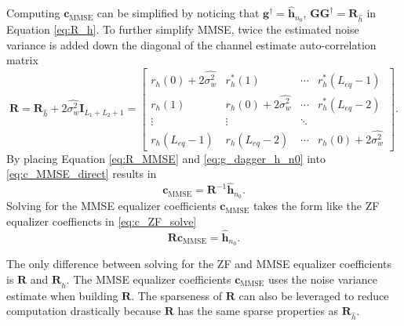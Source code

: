 Computing $\mathbf{c}_\text{MMSE}$ can be simplified by noticing that $\mathbf{g}^\dagger = \hat{\mathbf{h}}_{n_0}$, $\mathbf{G}\mathbf{G}^\dagger = \mathbf{R}_{\hat{h}}$ in Equation \eqref{eq:R_h}.
To further simplify MMSE, twice the estimated noise variance is added down the diagonal of the channel estimate auto-correlation matrix
\begin{equation}
\mathbf{R} = 
\mathbf{R}_{\hat{h}} + 2\hat{\sigma^2_w} \mathbf{I}_{L_1+L_2+1} = 
		\begin{bmatrix}
		r_{h}(0) + 2\hat{\sigma^2_w}	& r^\ast_{h}(1)							& \cdots 	& r^\ast_{h}(L_{eq}-1)  	\\
		r_{h}(1) 						& r_{h}(0) + 2\hat{\sigma^2_w}& \cdots 	& r^\ast_{h}(L_{eq}-2)  				\\
		\vdots	 						& \vdots								& \ddots 	&  							\\
		r_{h}(L_{eq}-1)					& r_{h}(L_{eq}-2)						& \cdots	& r_{h}(0) + 2\hat{\sigma^2_w}  			
	\end{bmatrix}.
	\label{eq:R_MMSE}
\end{equation}
By placing Equation \eqref{eq:R_MMSE} and \eqref{eq:g_dagger_h_n0} into \eqref{eq:c_MMSE_direct} results in
\begin{equation}
\mathbf{c}_\text{MMSE} = \mathbf{R}^{-1} \hat{\mathbf{h}}_{n_0}.
\end{equation}
Solving for the MMSE equalizer coefficients $\mathbf{c}_\text{MMSE}$ takes the form like the ZF equalizer coeffiencts in \eqref{eq:c_ZF_solve}
\begin{equation}
\mathbf{R}\mathbf{c}_\text{MMSE} = \hat{\mathbf{h}}_{n_0}.
\label{eq:c_MMSE_solve}
\end{equation}

The only difference between solving for the ZF and MMSE equalizer coefficients is $\mathbf{R}$ and $\mathbf{R}_{\hat{h}}$. 
The MMSE equalizer coefficients $\mathbf{c}_\text{MMSE}$ uses the noise variance estimate when building $\mathbf{R}$.
The sparseness of $\mathbf{R}$ can also be leveraged to reduce computation drastically because
$\mathbf{R}$ has the same sparse properties as $\mathbf{R}_{\hat{h}}$.

